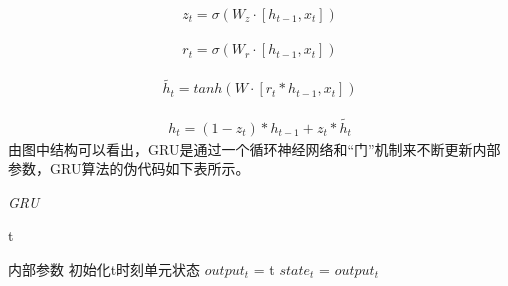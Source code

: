  \begin{equation}
    \begin{aligned}
        z_t = \sigma(W_z\cdot [h_{t-1},x_t])
    \end{aligned}
\end{equation}

\begin{equation}
    \begin{aligned}
        r_t = \sigma(W_r\cdot[h_{t-1},x_t])
    \end{aligned}
\end{equation}

\begin{equation}
    \begin{aligned}
        \widetilde {h_t} = tanh(W\cdot[r_t * h_{t-1}, x_t])
    \end{aligned}
\end{equation}

\begin{equation}
    \begin{aligned}
        h_t = (1- z_t) * h_{t-1} + z_t * \widetilde{h_t}
    \end{aligned}
\end{equation}
由图中结构可以看出，GRU是通过一个循环神经网络和“门”机制来不断更新内部参数，GRU算法的伪代码如下表所示。

\begin{algorithm}[!h]
    \caption{\emph{GRU}}
    \label{alg}
    \begin{algorithmic}[1]
      \Require
        t

      \Ensure
        内部参数
      \State 初始化t时刻单元状态
        $output_t$ = t
        $state_t$ = $output_t$
      \EndFor
    \end{algorithmic}
  \end{algorithm}

